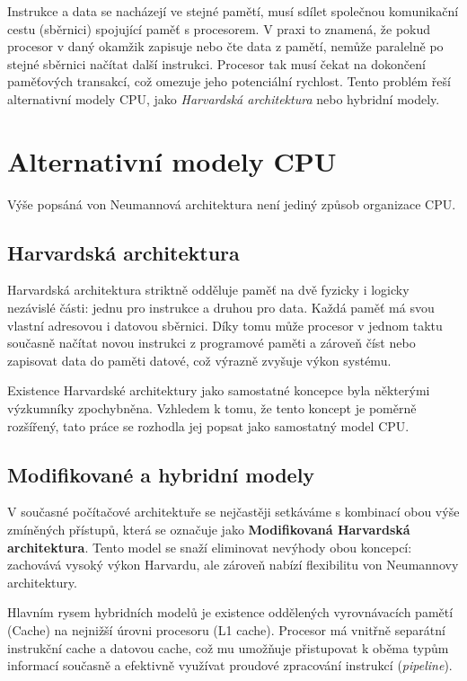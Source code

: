 Instrukce a data se nacházejí ve stejné pamětí, musí sdílet společnou komunikační cestu (sběrnici)
spojující paměť s procesorem. V praxi to znamená, že pokud procesor v daný okamžik zapisuje nebo čte
data z pamětí, nemůže paralelně po stejné sběrnici načítat další instrukci. Procesor tak musí čekat
na dokončení paměťových transakcí, což omezuje jeho potenciální rychlost. Tento problém řeší
alternativní modely CPU, jako \emph{Harvardská architektura} nebo hybridní modely.

\section{Alternativní modely CPU}

Výše popsáná von Neumannová architektura není jediný způsob organizace CPU.

\subsection{Harvardská architektura}

Harvardská architektura striktně odděluje paměť na dvě fyzicky i logicky nezávislé části: jednu pro
instrukce a druhou pro data. Každá paměť má svou vlastní adresovou i datovou sběrnici. Díky tomu
může procesor v jednom taktu současně načítat novou instrukci z programové paměti a zároveň číst
nebo zapisovat data do paměti datové, což výrazně zvyšuje výkon systému.

Existence Harvardské architektury jako samostatné koncepce byla některými výzkumníky
zpochybněna\cite{harvard-myth}. Vzhledem k tomu, že tento koncept je poměrně rozšířený, tato práce
se rozhodla jej popsat jako samostatný model CPU.

\subsection{Modifikované a hybridní modely}

V současné počítačové architektuře se nejčastěji setkáváme s kombinací obou výše zmíněných přístupů,
která se označuje jako \textbf{Modifikovaná Harvardská architektura}. Tento model se snaží
eliminovat nevýhody obou koncepcí: zachovává vysoký výkon Harvardu, ale zároveň nabízí flexibilitu
von Neumannovy architektury.

Hlavním rysem hybridních modelů je existence oddělených vyrovnávacích pamětí (Cache) na nejnižší
úrovni procesoru (L1 cache). Procesor má vnitřně separátní instrukční cache a datovou cache, což mu
umožňuje přistupovat k oběma typům informací současně a efektivně využívat proudové zpracování
instrukcí (\textit{pipeline}).


